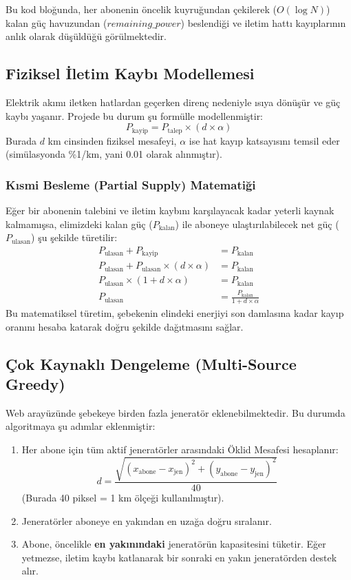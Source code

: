 \documentclass[12pt,a4paper]{article}
\begin{document}
Bu kod bloğunda, her abonenin öncelik kuyruğundan çekilerek ($O(\log N)$) kalan güç havuzundan ($remaining\_power$) beslendiği ve iletim hattı kayıplarının anlık olarak düşüldüğü görülmektedir.

\subsection{Fiziksel İletim Kaybı Modellemesi}
Elektrik akımı iletken hatlardan geçerken direnç nedeniyle ısıya dönüşür ve güç kaybı yaşanır. Projede bu durum şu formülle modellenmiştir:
\begin{equation}
    P_{\text{kayip}} = P_{\text{talep}} \times (d \times \alpha)
\end{equation}
Burada $d$ km cinsinden fiziksel mesafeyi, $\alpha$ ise hat kayıp katsayısını temsil eder (simülasyonda \%1/km, yani 0.01 olarak alınmıştır).

\subsubsection{Kısmi Besleme (Partial Supply) Matematiği}
Eğer bir abonenin talebini ve iletim kaybını karşılayacak kadar yeterli kaynak kalmamışsa, elimizdeki kalan güç ($P_{\text{kalan}}$) ile aboneye ulaştırılabilecek net güç ($P_{\text{ulasan}}$) şu şekilde türetilir:
\begin{align}
    P_{\text{ulasan}} + P_{\text{kayip}} &= P_{\text{kalan}} \\
    P_{\text{ulasan}} + P_{\text{ulasan}} \times (d \times \alpha) &= P_{\text{kalan}} \\
    P_{\text{ulasan}} \times (1 + d \times \alpha) &= P_{\text{kalan}} \\
    P_{\text{ulasan}} &= \frac{P_{\text{kalan}}}{1 + d \times \alpha}
\end{align}
Bu matematiksel türetim, şebekenin elindeki enerjiyi son damlasına kadar kayıp oranını hesaba katarak doğru şekilde dağıtmasını sağlar.

\subsection{Çok Kaynaklı Dengeleme (Multi-Source Greedy)}
Web arayüzünde şebekeye birden fazla jeneratör eklenebilmektedir. Bu durumda algoritmaya şu adımlar eklenmiştir:
\begin{enumerate}
    \item Her abone için tüm aktif jeneratörler arasındaki Öklid Mesafesi hesaplanır:
    \begin{equation}
        d = \frac{\sqrt{(x_{\text{abone}} - x_{\text{jen}})^2 + (y_{\text{abone}} - y_{\text{jen}})^2}}{40}
    \end{equation}
    (Burada 40 piksel = 1 km ölçeği kullanılmıştır).
    \item Jeneratörler aboneye en yakından en uzağa doğru sıralanır.
    \item Abone, öncelikle \textbf{en yakınındaki} jeneratörün kapasitesini tüketir. Eğer yetmezse, iletim kaybı katlanarak bir sonraki en yakın jeneratörden destek alır.
\end{enumerate}
\end{document}
